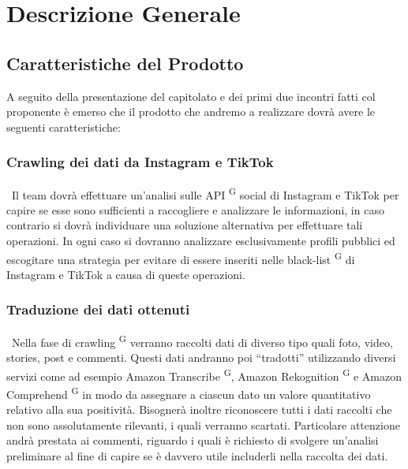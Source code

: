 \section{Descrizione Generale}

\subsection{Caratteristiche del Prodotto}

A seguito della presentazione del capitolato e dei primi due incontri fatti col proponente è emerso che il prodotto che andremo a realizzare dovrà avere le seguenti caratteristiche:

\subsubsection{Crawling dei dati da Instagram e TikTok} \ 
Il team dovrà effettuare un’analisi sulle API \textsuperscript{G} social di Instagram e TikTok per capire se esse sono sufficienti a raccogliere e analizzare le informazioni, in caso contrario si dovrà individuare una soluzione alternativa per effettuare tali operazioni. In ogni caso si dovranno analizzare esclusivamente profili pubblici ed escogitare una strategia per evitare di essere inseriti nelle black-list \textsuperscript{G} di Instagram e TikTok a causa di queste operazioni.

\subsubsection{Traduzione dei dati ottenuti} \
Nella fase di crawling \textsuperscript{G} verranno raccolti dati di diverso tipo quali foto, video, stories, post e commenti. Questi dati andranno poi “tradotti” utilizzando diversi servizi come ad esempio Amazon Transcribe \textsuperscript{G}, Amazon Rekognition \textsuperscript{G} e Amazon Comprehend \textsuperscript{G} in modo da assegnare a ciascun dato un valore quantitativo relativo alla sua positività. Bisognerà inoltre riconoscere tutti i dati raccolti che non sono assolutamente rilevanti, i quali verranno scartati. Particolare attenzione andrà prestata ai commenti, riguardo i quali è richiesto di svolgere un’analisi preliminare al fine di capire se è davvero utile includerli nella raccolta dei dati.

